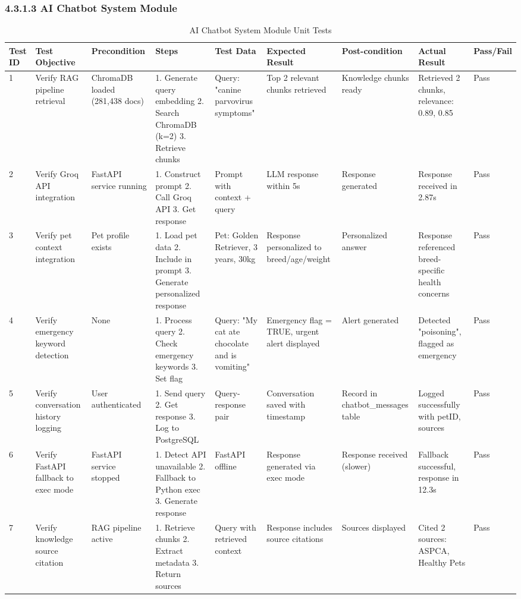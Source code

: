 \subsubsection{4.3.1.3 AI Chatbot System Module}

\begin{table}[H]
\centering
\caption{AI Chatbot System Module Unit Tests}
\tiny
\begin{tabular}{|p{0.4cm}|p{2cm}|p{1.2cm}|p{2cm}|p{2cm}|p{2cm}|p{1.5cm}|p{2cm}|p{0.7cm}|}
\hline
\textbf{Test ID} & \textbf{Test Objective} & \textbf{Precondition} & \textbf{Steps} & \textbf{Test Data} & \textbf{Expected Result} & \textbf{Post-condition} & \textbf{Actual Result} & \textbf{Pass/Fail} \\ \hline
1 & Verify RAG pipeline retrieval & ChromaDB loaded (281,438 docs) & 1. Generate query embedding 2. Search ChromaDB (k=2) 3. Retrieve chunks & Query: "canine parvovirus symptoms" & Top 2 relevant chunks retrieved & Knowledge chunks ready & Retrieved 2 chunks, relevance: 0.89, 0.85 & Pass \\ \hline
2 & Verify Groq API integration & FastAPI service running & 1. Construct prompt 2. Call Groq API 3. Get response & Prompt with context + query & LLM response within 5s & Response generated & Response received in 2.87s & Pass \\ \hline
3 & Verify pet context integration & Pet profile exists & 1. Load pet data 2. Include in prompt 3. Generate personalized response & Pet: Golden Retriever, 3 years, 30kg & Response personalized to breed/age/weight & Personalized answer & Response referenced breed-specific health concerns & Pass \\ \hline
4 & Verify emergency keyword detection & None & 1. Process query 2. Check emergency keywords 3. Set flag & Query: "My cat ate chocolate and is vomiting" & Emergency flag = TRUE, urgent alert displayed & Alert generated & Detected "poisoning", flagged as emergency & Pass \\ \hline
5 & Verify conversation history logging & User authenticated & 1. Send query 2. Get response 3. Log to PostgreSQL & Query-response pair & Conversation saved with timestamp & Record in chatbot\_messages table & Logged successfully with petID, sources & Pass \\ \hline
6 & Verify FastAPI fallback to exec mode & FastAPI service stopped & 1. Detect API unavailable 2. Fallback to Python exec 3. Generate response & FastAPI offline & Response generated via exec mode & Response received (slower) & Fallback successful, response in 12.3s & Pass \\ \hline
7 & Verify knowledge source citation & RAG pipeline active & 1. Retrieve chunks 2. Extract metadata 3. Return sources & Query with retrieved context & Response includes source citations & Sources displayed & Cited 2 sources: ASPCA, Healthy Pets & Pass \\ \hline
\end{tabular}
\label{tab:chatbot_tests}
\end{table}


